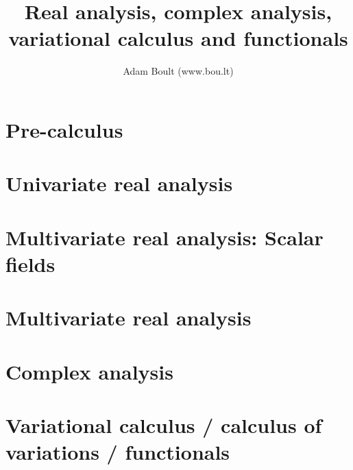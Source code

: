 \documentclass[oneside]{book}
\begin{document}
\author{Adam Boult (www.bou.lt)}
\title{Real analysis, complex analysis, variational calculus and functionals}
\maketitle

\setcounter{tocdepth}{0}
\tableofcontents



\part{Pre-calculus}






\part{Univariate real analysis}












\part{Multivariate real analysis: Scalar fields}




\part{Multivariate real analysis}





\part{Complex analysis}





\part{Variational calculus / calculus of variations / functionals}

\end{document}
